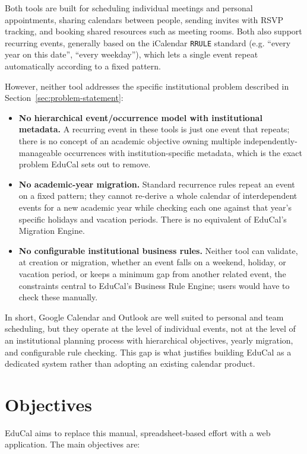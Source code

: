 Both tools are built for scheduling individual meetings and personal appointments, sharing calendars between people, sending invites with RSVP tracking, and booking shared resources such as meeting rooms. Both also support recurring events, generally based on the iCalendar \texttt{RRULE} standard (e.g. ``every year on this date'', ``every weekday''), which lets a single event repeat automatically according to a fixed pattern.

However, neither tool addresses the specific institutional problem described in Section~\ref{sec:problem-statement}:

\begin{itemize}
    \item \textbf{No hierarchical event/occurrence model with institutional metadata.} A recurring event in these tools is just one event that repeats; there is no concept of an academic objective owning multiple independently-manageable occurrences with institution-specific metadata, which is the exact problem EduCal sets out to remove.
    \item \textbf{No academic-year migration.} Standard recurrence rules repeat an event on a fixed pattern; they cannot re-derive a whole calendar of interdependent events for a new academic year while checking each one against that year's specific holidays and vacation periods. There is no equivalent of EduCal's Migration Engine.
    \item \textbf{No configurable institutional business rules.} Neither tool can validate, at creation or migration, whether an event falls on a weekend, holiday, or vacation period, or keeps a minimum gap from another related event, the constraints central to EduCal's Business Rule Engine; users would have to check these manually.
\end{itemize}

In short, Google Calendar and Outlook are well suited to personal and team scheduling, but they operate at the level of individual events, not at the level of an institutional planning process with hierarchical objectives, yearly migration, and configurable rule checking. This gap is what justifies building EduCal as a dedicated system rather than adopting an existing calendar product.

\section{Objectives} \label{sec:objectives}

EduCal aims to replace this manual, spreadsheet-based effort with a web application. The main objectives are:

